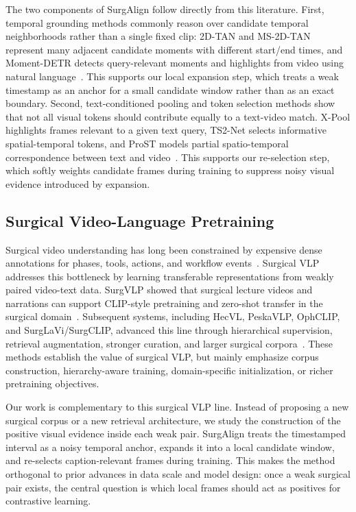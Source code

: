 The two components of SurgAlign follow directly from this literature. First, temporal grounding methods commonly reason over candidate temporal neighborhoods rather than a single fixed clip: 2D-TAN and MS-2D-TAN represent many adjacent candidate moments with different start/end times, and Moment-DETR detects query-relevant moments and highlights from video using natural language~\cite{twodtan2020,ms2dtan2022,momentdetr2021}. This supports our local expansion step, which treats a weak timestamp as an anchor for a small candidate window rather than as an exact boundary. Second, text-conditioned pooling and token selection methods show that not all visual tokens should contribute equally to a text-video match. X-Pool highlights frames relevant to a given text query, TS2-Net selects informative spatial-temporal tokens, and ProST models partial spatio-temporal correspondence between text and video~\cite{gorti2022xpool,ts2net2022,li2023prost}. This supports our re-selection step, which softly weights candidate frames during training to suppress noisy visual evidence introduced by expansion.

\subsection{Surgical Video-Language Pretraining}

Surgical video understanding has long been constrained by expensive dense annotations for phases, tools, actions, and workflow events~\cite{tecno2020,lessismore2022,rendezvous2022}. Surgical VLP addresses this bottleneck by learning transferable representations from weakly paired video-text data. SurgVLP showed that surgical lecture videos and narrations can support CLIP-style pretraining and zero-shot transfer in the surgical domain~\cite{lecturevideo2023}. Subsequent systems, including HecVL, PeskaVLP, OphCLIP, and SurgLaVi/SurgCLIP, advanced this line through hierarchical supervision, retrieval augmentation, stronger curation, and larger surgical corpora~\cite{hecvl2024,peskavlp2024,ophclip2025,surglavi2025}. These methods establish the value of surgical VLP, but mainly emphasize corpus construction, hierarchy-aware training, domain-specific initialization, or richer pretraining objectives.

Our work is complementary to this surgical VLP line. Instead of proposing a new surgical corpus or a new retrieval architecture, we study the construction of the positive visual evidence inside each weak pair. SurgAlign treats the timestamped interval as a noisy temporal anchor, expands it into a local candidate window, and re-selects caption-relevant frames during training. This makes the method orthogonal to prior advances in data scale and model design: once a weak surgical pair exists, the central question is which local frames should act as positives for contrastive learning.
